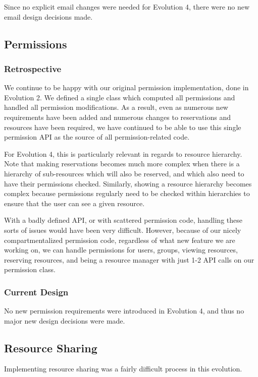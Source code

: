 \documentclass[12pt]{article}
\begin{document}
Since no explicit email changes were needed for Evolution 4, there were no new email design decisions made. 


\subsection{Permissions}
\subsubsection{Retrospective}
We continue to be happy with our original permission implementation, done in Evolution 2. We defined a single class which computed all permissions and handled all permission modifications. As a result, even as numerous new requirements have been added and numerous changes to reservations and resources have been required, we have continued to be able to use this single permission API as the source of all permission-related code. 

For Evolution 4, this is particularly relevant in regards to resource hierarchy. Note that making reservations becomes much more complex when there is a hierarchy of sub-resources which will also be reserved, and which also need to have their permissions checked. Similarly, showing a resource hierarchy becomes complex because permissions regularly need to be checked within hierarchies to ensure that the user can see a given resource. 

With a badly defined API, or with scattered permission code, handling these sorts of issues would have been very difficult. However, because of our nicely compartmentalized permission code, regardless of what new feature we are working on, we can handle permissions for users, groups, viewing resources, reserving resources, and being a resource manager with just 1-2 API calls on our permission class. 

\subsubsection{Current Design}
No new permission requirements were introduced in Evolution 4, and thus no major new design decisions were made. 

\subsection{Resource Sharing}
Implementing resource sharing was a fairly difficult process in this evolution.
\end{document}
